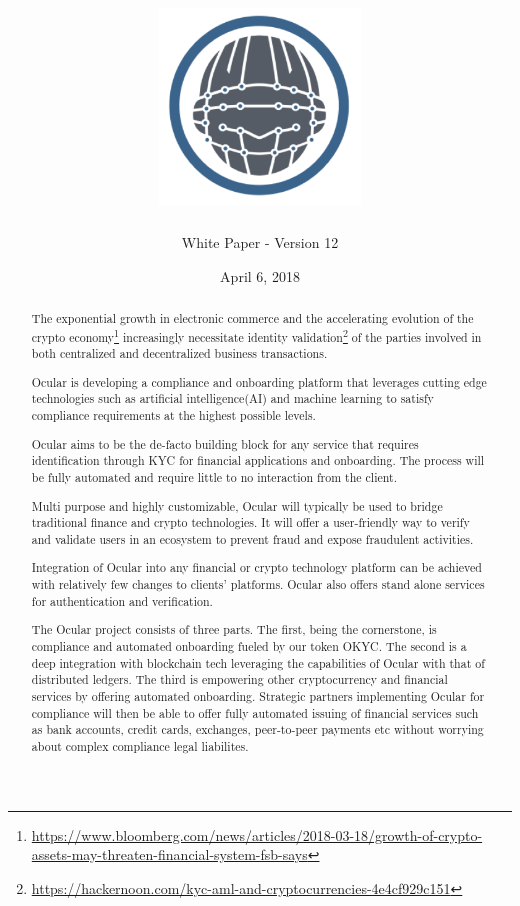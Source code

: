 \documentclass[12pt]{article}
\title{\includegraphics[width=0.4\textwidth]{logo.png}}
\author{White Paper - Version 12}
\date{April 6, 2018}
\begin{document}
\maketitle

\begin{abstract}
The exponential growth in electronic commerce and the accelerating evolution of the crypto economy\footnote{\url{https://www.bloomberg.com/news/articles/2018-03-18/growth-of-crypto-assets-may-threaten-financial-system-fsb-says}} increasingly necessitate identity validation\footnote{\url{https://hackernoon.com/kyc-aml-and-cryptocurrencies-4e4cf929c151}} of the parties involved in both centralized and decentralized business transactions. 

Ocular is developing a compliance and onboarding platform that leverages cutting edge technologies such as artificial intelligence(AI) and machine learning to satisfy compliance requirements at the highest possible levels.

Ocular aims to be the de-facto building block for any service that requires identification through KYC for financial applications and onboarding. The process will be fully automated and require little to no interaction from the client. 

Multi purpose and highly customizable, Ocular will typically be used to bridge traditional finance and crypto technologies. It will offer a user-friendly way to verify and validate users in an ecosystem to prevent fraud and expose fraudulent activities. 

Integration of Ocular into any financial or crypto technology platform can be achieved with relatively few changes to clients’ platforms. Ocular also offers stand alone services for authentication and verification. 

The Ocular project consists of three parts. The first, being the cornerstone, is compliance and automated onboarding fueled by our token OKYC. The second is a deep integration with blockchain tech leveraging the capabilities of Ocular with that of distributed ledgers. The third is empowering other cryptocurrency and financial services by offering automated onboarding. Strategic partners implementing Ocular for compliance will then be able to offer fully automated issuing of financial services such as bank accounts, credit cards, exchanges, peer-to-peer payments etc without worrying about complex compliance legal liabilites. 
\end{abstract}

\pagebreak
\end{document}
